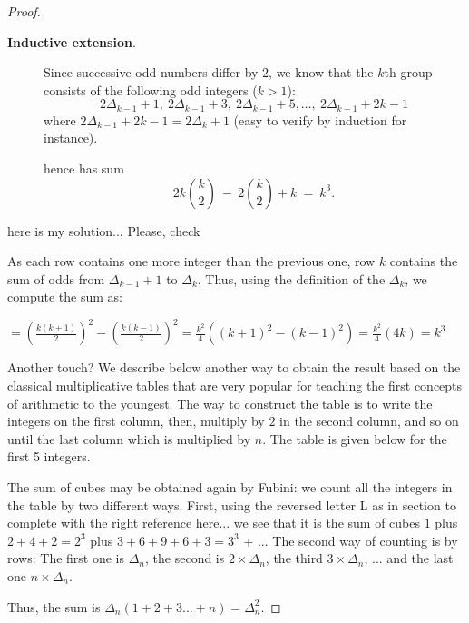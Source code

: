 \begin{proof}
\begin{description}
\item[{\bf Inductive extension}.]
%
Since successive odd numbers differ by $2$, we know that the $k$th
group consists of the following odd integers ($k>1$):
\[
2 \Delta_{k-1} +1, \ 2 \Delta_{k-1}  +3, \ 2 \Delta_{k-1}  +5 ,
\ldots, \
2 \Delta_{k-1} +2k-1
\]
where $2 \Delta_{k-1} +2k-1 = 2 \Delta_{k} +1$ (easy to verify by induction for instance).

hence has sum
\[
2k {k \choose 2} \ - \ 2 {k \choose 2} +k
\ = \ k^3.
\]
\end{description}

{\Denis here is my solution... Please, check}

As each row contains one more integer than the previous one, 
row $k$ contains the sum of odds from $\Delta_{k-1}+1$ to $\Delta_k$.
Thus, using the definition of the $\Delta_{k}$, we compute the sum as:

$= (\frac{k(k+1)}{2})^2 - (\frac{k(k-1)}{2})^2 = \frac{k^2}{4}((k+1)^2 - (k-1)^2) = \frac{k^2}{4} (4k) = k^3$

{\Denis Another touch?}
We describe below another way to obtain the result based on the classical multiplicative tables
that are very popular for teaching the first concepts of arithmetic to the youngest.
The way to construct the table is to write the integers on the first column, then, multiply by $2$ in the second column, and so on
until the last column which is multiplied by $n$.
The table is given below for the first 5 integers.


The sum of cubes may be obtained again by Fubini:
we count all the integers in the table by two different ways.
First, using the reversed letter L as in section {\Denis to complete with the right reference here...}
we see that it is the sum of cubes $1$ plus $2+4+2=2^3$ plus $3+6+9+6+3 = 3^3$ + ...
The second way of counting is by rows:
The first one is $\Delta_n$, the second is $2 \times \Delta_n$, the third $3 \times \Delta_n$, ... and the last one $n \times \Delta_n$.

Thus, the sum is $\Delta_n (1+2+3 ... + n) = \Delta_n^2$.


\end{proof}
